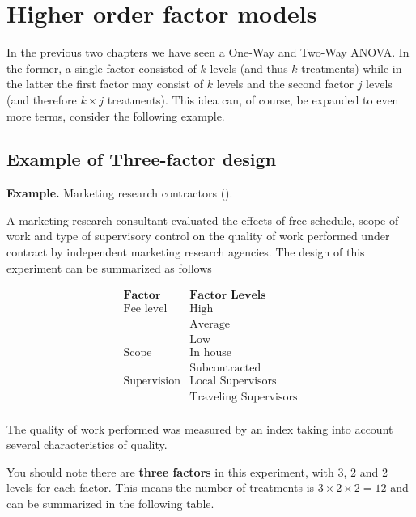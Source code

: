 \documentclass[
]{book}
\begin{document}
\hypertarget{higher-order-factor-models}{%
\section{Higher order factor models}\label{higher-order-factor-models}}

In the previous two chapters we have seen a One-Way and Two-Way ANOVA.
In the former, a single factor consisted of \(k\)-levels (and thus \(k\)-treatments) while in the latter the first factor may consist of \(k\) levels and the second factor \(j\) levels (and therefore \(k\times j\) treatments).
This idea can, of course, be expanded to even more terms, consider the following example.

\hypertarget{example-of-three-factor-design}{%
\subsection{Example of Three-factor design}\label{example-of-three-factor-design}}

\textbf{Example.} Marketing research contractors (\citet{KutnerText}).

A marketing research consultant evaluated the effects of free schedule, scope of work and type of supervisory control on the quality of work performed under contract by independent marketing research agencies.
The design of this experiment can be summarized as follows

\[\begin{array}{ll} 
\textbf{Factor} & \textbf{Factor Levels} \\
\hline
\textrm{Fee level} & \textrm{High} \\
 & \textrm{Average} \\
 & \textrm{Low}\\
 \hline
\textrm{Scope} & \textrm{In house} \\
 & \textrm{Subcontracted} \\
\hline
\textrm{Supervision} & \textrm{Local Supervisors}\\
 & \textrm{Traveling Supervisors} \\
\end{array}\]

The quality of work performed was measured by an index taking into account several characteristics of quality.

You should note there are \textbf{three factors} in this experiment, with 3, 2 and 2 levels for each factor.
This means the number of treatments is \(3\times 2\times 2 = 12\) and can be summarized in the following table.
\end{document}
